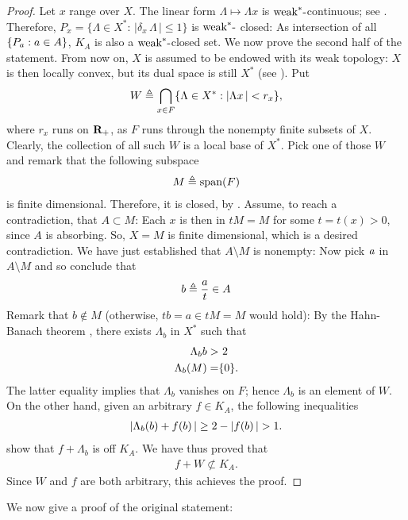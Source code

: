 \begin{proof}%
Let $x$ range over $X$. The linear form %
%
  $\Lambda \mapsto \Lambda x$ %
%
is $\text{weak}^\ast\text{-}$continuous; see . %
Therefore, %
%
  $P_x=\{ \Lambda \in X^\ast:\, \lvert \delta_x \,\Lambda  \,\rvert \leq 1\}$ %
%
is $\text{weak}^\ast\text{-}$ closed: %
As intersection of all $\{P_a: a\in A\}$, %
$K_A$ is also a $\text{weak}^\ast\text{-}$closed set. %
We now prove the second half of the statement. %
%
\newline\newline\noindent
%
From now on, $X$ is assumed to be endowed with its weak topology: %
$X$ is then locally convex, but its dual space is still %
%
  $X^\ast$ (see ). %
%
Put %
%
  \begin{align}
    W \triangleq \bigcap_{x\in F} \{\Lambda \in X^\ast: \left\lvert \Lambda x \,\right\rvert < r_x\}, 
  \end{align}
%
where $r_x$ runs on ${\mathbf R}_+$, %
as $F$ runs through the nonempty finite subsets of $X$. %
%
Clearly, the collection of all such $W$ is a local base of $X^\ast$. %
Pick one of those $W$ and remark that the following subspace %
%
  \begin{align}
    M \triangleq \text{span}(F)
  \end{align}
%
is finite dimensional. Therefore, it is closed, by . %
%
Assume, to reach a contradiction, that $A\subset M$: %
Each $x$ is then in $tM=M$ for some $t=t(x)>0$, since $A$ is absorbing. %
So, $X=M$ is finite dimensional, which is a desired contradiction.
%
We have just established that $A\setminus M$ is nonempty: %
Now pick $\mathit{a}$ in $A\setminus M$ and so conclude that %
%
  \begin{align}
    b\triangleq \frac{a}{t}\in A
  \end{align}
%
Remark that $b\notin M$ (otherwise, $t b = a \in tM=M$ would hold): %
By the Hahn-Banach theorem , %
there exists $\Lambda_b$ in $X^\ast$ such that 
%
  \begin{align}
    \label{3.11. Polar_4.}\Lambda_b b    > & \,\,2 \\
    \label{3.11. Polar_4bis.}\Lambda_b (M) = & \{0\}.
  \end{align}
%
The latter equality implies that $\Lambda_b$ vanishes on $F$; %
hence $\Lambda_b$ is an element of $W$. %
On the other hand, given an arbitrary $f\in K_A$, %
the following inequalities  %
%
  \begin{align}
    \left\lvert \Lambda_b (b) + f(b) \,\right\rvert 
      \geq 
    2 - \left\lvert f(b) \,\right\rvert 
      >
    1.
  \end{align}
%
show that $f + \Lambda_b$ is off $K_A$. %
%
We have thus proved that
%
  \begin{align}
  f+ W\not\subset K_A.
  \end{align}
%
Since $W$ and $f$ are both arbitrary, this achieves the proof. %
\end{proof}
%
\noindent
We now give a proof of the original statement:
%
